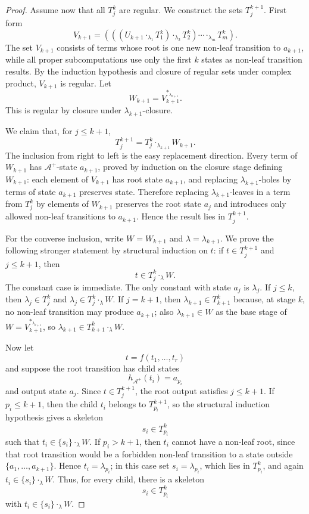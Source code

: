 \documentclass[11pt]{article}
\theoremstyle{definition}
\newcommand{\Aut}{\mathcal A}
\begin{document}
\begin{proof}
Assume now that all \(T_j^k\) are regular.  We construct the sets \(T_j^{k+1}\).
First form
\[
  V_{k+1}
  =
  (((U_{k+1}\cdot_{\lambda_1}T_1^k)
      \cdot_{\lambda_2}T_2^k)\cdots
      \cdot_{\lambda_m}T_m^k).
\]
The set \(V_{k+1}\) consists of terms whose root is one new non-leaf transition
to \(a_{k+1}\), while all proper subcomputations use only the first \(k\) states
as non-leaf transition results.  By the induction hypothesis and closure of
regular sets under complex product, \(V_{k+1}\) is regular.  Let
\[
  W_{k+1}=V_{k+1}^{*_{\lambda_{k+1}}}.
\]
This is regular by closure under \(\lambda_{k+1}\)-closure.

We claim that, for \(j\le k+1\),
\[
  T_j^{k+1}=T_j^k\cdot_{\lambda_{k+1}}W_{k+1}.       \tag{\(*\)}
\]
The inclusion from right to left is the easy replacement direction.  Every term
of \(W_{k+1}\) has \(\Aut^+\)-state \(a_{k+1}\), proved by induction on the
closure stage defining \(W_{k+1}\): each element of \(V_{k+1}\) has root state
\(a_{k+1}\), and replacing \(\lambda_{k+1}\)-holes by terms of state
\(a_{k+1}\) preserves state.  Therefore replacing \(\lambda_{k+1}\)-leaves in a
term from \(T_j^k\) by elements of \(W_{k+1}\) preserves the root state \(a_j\)
and introduces only allowed non-leaf transitions to \(a_{k+1}\).  Hence the
result lies in \(T_j^{k+1}\).

For the converse inclusion, write \(W=W_{k+1}\) and
\(\lambda=\lambda_{k+1}\).  We prove the following stronger statement by
structural induction on \(t\): if \(t\in T_j^{k+1}\) and \(j\le k+1\), then
\[
  t\in T_j^k\cdot_\lambda W.        \tag{\(**\)}
\]
The constant case is immediate.  The only constant with state \(a_j\) is
\(\lambda_j\).  If \(j\le k\), then \(\lambda_j\in T_j^k\) and
\(\lambda_j\in T_j^k\cdot_\lambda W\).  If \(j=k+1\), then
\(\lambda_{k+1}\in T_{k+1}^k\) because, at stage \(k\), no non-leaf transition
may produce \(a_{k+1}\); also \(\lambda_{k+1}\in W\) as the base stage of
\(W=V_{k+1}^{*_{\lambda_{k+1}}}\), so
\(\lambda_{k+1}\in T_{k+1}^k\cdot_\lambda W\).

Now let
\[
  t=f(t_1,\ldots,t_r)
\]
and suppose the root transition has child states
\[
  h_{\Aut^+}(t_i)=a_{p_i}
\]
and output state \(a_j\).  Since \(t\in T_j^{k+1}\), the root output satisfies
\(j\le k+1\).  If \(p_i\le k+1\), then the child \(t_i\) belongs to
\(T_{p_i}^{k+1}\), so the structural induction hypothesis gives a skeleton
\[
  s_i\in T_{p_i}^k
\]
such that \(t_i\in\{s_i\}\cdot_\lambda W\).  If \(p_i>k+1\), then \(t_i\) cannot
have a non-leaf root, since that root transition would be a forbidden non-leaf
transition to a state outside \(\{a_1,\ldots,a_{k+1}\}\).  Hence
\(t_i=\lambda_{p_i}\); in this case set \(s_i=\lambda_{p_i}\), which lies in
\(T_{p_i}^k\), and again \(t_i\in\{s_i\}\cdot_\lambda W\).  Thus, for every
child, there is a skeleton
\[
  s_i\in T_{p_i}^k
\]
with \(t_i\in\{s_i\}\cdot_\lambda W\).


\end{proof}
\end{document}
